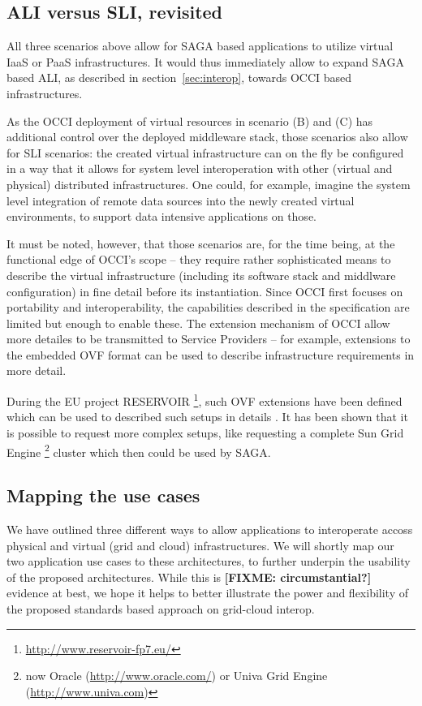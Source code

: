 \documentclass[10pt,conference,final,letterpaper,twoside,twocolumn,]{IEEEtran}
\newcommand{\B}[1]{\textbf{#1}}
\newcommand{\F}[1]{\B{[FIXME: #1]}}
\begin{document}
 \subsection{ALI versus SLI, revisited}

 All three scenarios above allow for SAGA based applications to
 utilize virtual IaaS or PaaS infrastructures.  It would thus
 immediately allow to expand SAGA based ALI, as described in
 section~\ref{sec:interop}, towards OCCI based infrastructures.

 As the OCCI deployment of virtual resources in scenario (B) and (C)
 has additional control over the deployed middleware stack, those
 scenarios also allow for SLI scenarios: the created virtual
 infrastructure can on the fly be configured in a way that it allows
 for system level interoperation with other (virtual and physical)
 distributed infrastructures.  One could, for example, imagine the
 system level integration of remote data sources into the newly
 created virtual environments, to support data intensive applications
 on those.

 It must be noted, however, that those scenarios are, for the time
 being, at the functional edge of OCCI's scope -- they require rather
 sophisticated means to describe the virtual infrastructure (including
 its software stack and middlware configuration) in fine detail before
 its instantiation. Since OCCI first focuses on portability and
 interoperability, the capabilities described in the specification are
 limited but enough to enable these. The extension mechanism of OCCI
 allow more detailes to be transmitted to Service Providers -- for
 example, extensions to the embedded OVF format can be used to describe
 infrastructure requirements in more detail.

 During the EU project RESERVOIR
 \footnote{\url{http://www.reservoir-fp7.eu/}}, such OVF extensions have been
 defined which can be used to described such setups in details
 \cite{comsware09}.  It has been shown that it is possible to request
 more complex setups, like requesting a complete Sun Grid Engine
 \footnote{now Oracle (\url{http://www.oracle.com/}) or Univa Grid
 Engine (\url{http://www.univa.com})} cluster which then could be used
 by SAGA.


 \subsection{Mapping the use cases}

 We have outlined three different ways to allow applications to
 interoperate accoss physical and virtual (grid and cloud)
 infrastructures.  We will shortly map our two application use cases
 to these architectures, to further underpin the usability of the
 proposed architectures.  While this is \F{circumstantial?} evidence
 at best, we hope it helps to better illustrate the power and
 flexibility of the proposed standards based approach on grid-cloud
 interop.
\end{document}
